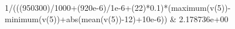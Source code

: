 1/(((950300)/1000+(920e-6)/1e-6+(22)*0.1)*(maximum(v(5))-minimum(v(5))+abs(mean(v(5))-12)+10e-6)) & 2.178736e+00\\ \hline
